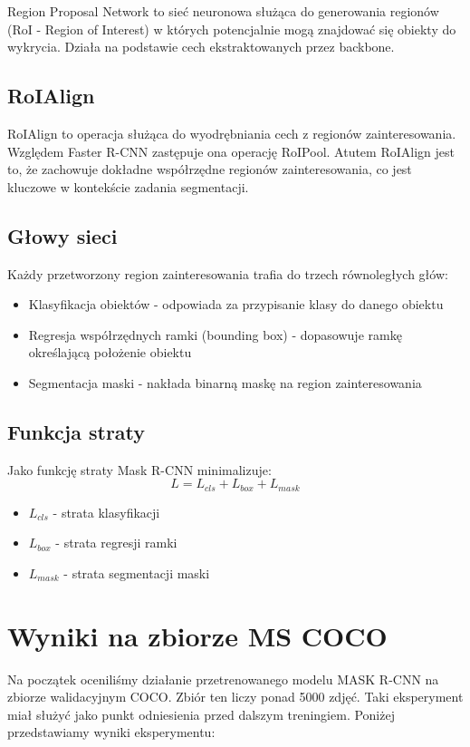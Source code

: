 \documentclass[licencjacka]{pracamgr}
\begin{document}
Region Proposal Network to sieć neuronowa służąca do generowania regionów (RoI - Region of Interest) w których potencjalnie mogą znajdować się obiekty do wykrycia. Działa na podstawie cech ekstraktowanych przez backbone.

\subsection{RoIAlign}
RoIAlign to operacja służąca do wyodrębniania cech z regionów zainteresowania. Względem Faster R-CNN zastępuje ona operację RoIPool. Atutem RoIAlign jest to, że zachowuje dokładne współrzędne regionów zainteresowania, co jest kluczowe w kontekście zadania segmentacji.

\subsection{Głowy sieci}
Każdy przetworzony region zainteresowania trafia do trzech równoległych głów:

\begin{itemize}
    \item Klasyfikacja obiektów - odpowiada za przypisanie klasy do danego obiektu
    \item Regresja współrzędnych ramki (bounding box) - dopasowuje ramkę określającą położenie obiektu
    \item Segmentacja maski - nakłada binarną maskę na region zainteresowania 
\end{itemize}

\subsection{Funkcja straty}
Jako funkcję straty Mask R-CNN minimalizuje:
$$L=L_{cls}+L_{box}+L_{mask}$$

\begin{itemize}
    \item $L_{cls}$ - strata klasyfikacji
    \item $L_{box}$ - strata regresji ramki
    \item $L_{mask}$ - strata segmentacji maski
\end{itemize}

\section{Wyniki na zbiorze MS COCO}

Na początek oceniliśmy działanie przetrenowanego modelu MASK R-CNN na zbiorze walidacyjnym COCO. Zbiór ten liczy ponad 5000 zdjęć. Taki eksperyment miał służyć jako punkt odniesienia przed dalszym treningiem. Poniżej przedstawiamy wyniki eksperymentu:
\end{document}
